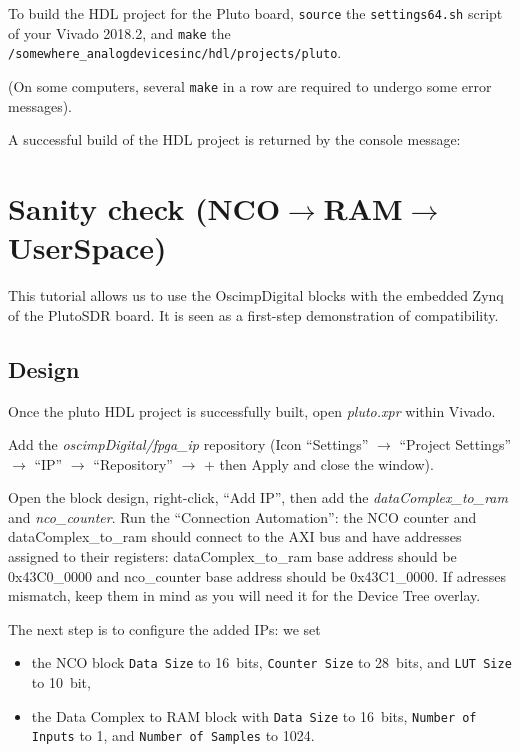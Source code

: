 \documentclass[12pt,oneside]{article}
\begin{document}
To build the HDL project for the Pluto board, {\tt source} the
{\tt settings64.sh} script of your Vivado 2018.2, and {\tt make} the
{\tt /somewhere\_analogdevicesinc/hdl/projects/pluto}.

(On some computers, several {\tt make} in a row are required to undergo some error messages). 

A successful build of the HDL project is returned by the console message:\\


\section{Sanity check (NCO$\to$RAM$\to$UserSpace)}
This tutorial allows us to use the OscimpDigital blocks with the embedded Zynq of
the PlutoSDR board. It is seen as a first-step demonstration of compatibility.

\subsection{Design}

Once the pluto HDL project is successfully built, open \emph{pluto.xpr} within
Vivado. 

Add the \emph{oscimpDigital/fpga\_ip} repository (Icon ``Settings'' $\to$ ``Project
Settings'' $\to$ ``IP'' $\to$ ``Repository'' $\to$ + then Apply and close the window).

Open the block design, right-click, ``Add IP'', then add the \emph{dataComplex\_to\_ram} 
and \emph{nco\_counter}. Run the ``Connection Automation'': the NCO counter and dataComplex\_to\_ram
should connect to the AXI bus and have addresses assigned to their registers: dataComplex\_to\_ram
base address should be 0x43C0\_0000 and nco\_counter base address should be 0x43C1\_0000. 
If adresses mismatch, keep them in mind as you will need it for the Device Tree overlay.

The next step is to configure the added IPs: %
we set
\begin{itemize}
\item the NCO block {\tt Data Size} to 16~bits, {\tt Counter Size} to 28~bits, and {\tt LUT
Size} to 10~bit,
\item the Data Complex to RAM block with {\tt Data Size} to 16~bits, {\tt Number of Inputs}
to 1, and {\tt Number of Samples} to 1024. %
\end{itemize}
\end{document}

